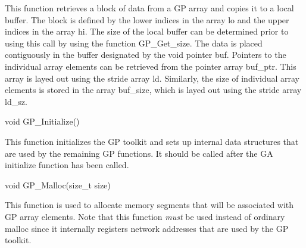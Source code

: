 \documentclass[12pt]{article}
\begin{document}
\begin{desc}

This function retrieves a block of data from a GP array and copies it to a local
buffer.  The block is defined by the lower indices in the array lo
and the upper indices in the array hi. The size of the local buffer can be
determined prior to using this call by using the function GP\_Get\_size. The
data is placed contiguously in the buffer designated by the void pointer buf.
Pointers to the individual array elements can be retrieved from the pointer
array buf\_ptr. This array is layed out using the stride array ld. Similarly,
the size of individual array elements is stored in the array buf\_size, which is
layed out using the stride array ld\_sz.

\end{desc}



\begin{capi}
\begin{ccode}
void GP_Initialize()
\end{ccode}
\end{capi}

\wcoll

\begin{desc}

This function initializes the GP toolkit and sets up internal data structures
that are used by the remaining GP functions. It should be called after the GA
initialize function has been called.

\end{desc}



\begin{capi}
\begin{ccode}
void GP_Malloc(size_t size)
\end{ccode}
\begin{funcargs}
\end{funcargs}
\end{capi}

\local

\begin{desc}

This function is used to allocate memory segments that will be associated with
GP array elements. Note that this function \emph{must} be used instead of
ordinary malloc since it internally registers network addresses that are used by
the GP toolkit.

\end{desc}
\end{document}
